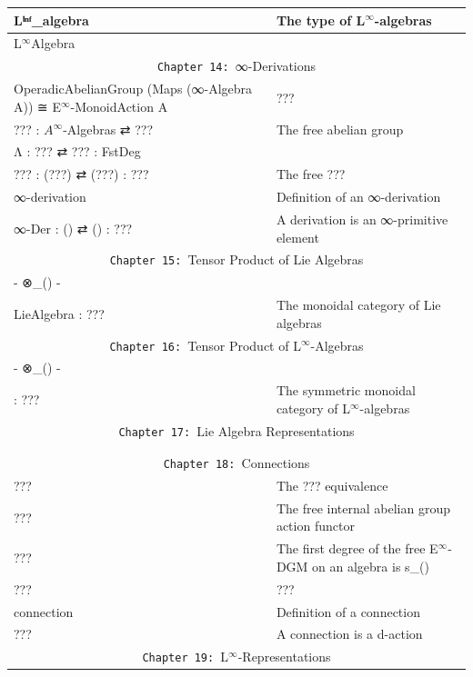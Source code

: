 \documentclass{book}
\theoremstyle{definition}
\begin{document}
{\begin{longtable}{|| l || l ||}
\hline \hline
Lⁱⁿᶠ\_algebra & The type of L${}^{\infty}$-algebras  \\
\hline
L${}^{\infty}$Algebra &  \\
\hline \hline
\multicolumn{2}{||c||}{\texttt{Chapter 14: }∞-Derivations} \\
\hline \hline
OperadicAbelianGroup (Maps (∞-Algebra A)) ≅ E${}^{\infty}$-MonoidAction A & ??? \\
\hline
??? : $A{}^{\infty}$-Algebras ⇄ ???  & The free abelian group \\
\hline
Λ : ??? ⇄ ??? : FstDeg &  \\ 
\hline
??? : (???) ⇄ (???) : ??? & The free ??? \\
\hline
∞-derivation & Definition of an ∞-derivation \\
\hline
∞-Der : () ⇄ () : ??? & A derivation is an ∞-primitive element \\
\hline \hline
\multicolumn{2}{||c||}{\texttt{Chapter 15: }Tensor Product of Lie Algebras} \\
\hline \hline
- ⊗\_() - &  \\
\hline
LieAlgebra : ??? & The monoidal category of Lie algebras\\
\hline \hline
\multicolumn{2}{||c||}{\texttt{Chapter 16: }Tensor Product of L${}^{\infty}$-Algebras} \\
\hline \hline
- ⊗\_() - & \\ 
 \hline
 : ??? & The symmetric monoidal category of L${}^{\infty}$-algebras \\
 \hline \hline
\multicolumn{2}{||c||}{\texttt{Chapter 17: }Lie Algebra Representations} \\
\hline \hline
 & \\
\hline
 & \\
\hline \hline
\multicolumn{2}{||c||}{\texttt{Chapter 18: }Connections} \\
\hline \hline
??? & The ??? equivalence \\
\hline
??? & The free internal abelian group action functor \\
\hline
??? & The first degree of the free E${}^{\infty}$-DGM on an algebra is s\_() \\
\hline
???   & ??? \\
\hline
connection & Definition of a connection \\
\hline
??? & A connection is a d-action \\
\hline \hline
\multicolumn{2}{||c||}{\texttt{Chapter 19: }L${}^{\infty}$-Representations} \\

\end{longtable}}
\end{document}
